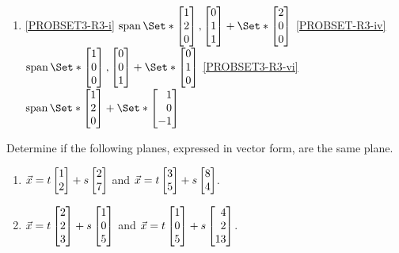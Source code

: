 \begin{exercises}
\begin{problist}
\begin{solution}
\begin{enumerate}
\begin{enumerate}
				\end{enumerate}
				\item 
				\begin{enumerate}
					\ref{PROBSET3-R3-i} $\Span\Set*{\mat{1\\2\\0}, \mat{0\\1\\1}} + \Set*{\mat{2\\0\\0}}$
					\ref{PROBSET-R3-iv}$\Span\Set*{\mat{1\\0\\0}, \mat{0\\0\\1}} + \Set*{\mat{0\\1\\0}}$
					\ref{PROBSET3-R3-vi}$\Span\Set*{\mat{1\\2\\0}} + \Set*{\mat{1\\0\\-1}}$
				\end{enumerate}
			\end{enumerate}
		\end{solution}
		
		\prob Determine if the following planes, expressed in vector form, are the same plane.
		\begin{enumerate}
			\item $\vec x = t\mat{1\\2}+ s\mat{2\\7}$ and $\vec x =
			t\mat{3\\5}+ s\mat{8\\4}$.
			
			\item $\vec x = t\mat{2\\2\\3}+ s\mat{1\\0\\5}$ and $\vec
			x = t\mat{1\\0\\5}+ s\mat{4\\2\\13}$.
			

\end{enumerate}
\end{problist}
\end{exercises}
